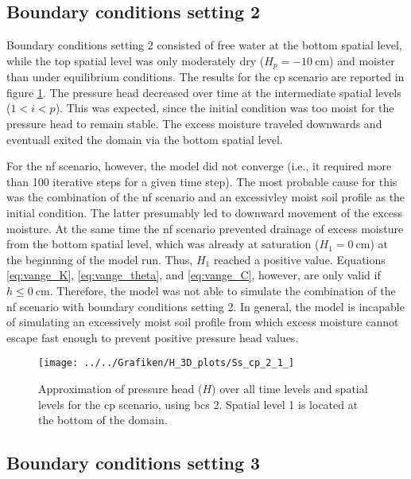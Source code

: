 \subsection{Boundary conditions setting 2}

Boundary conditions setting 2 consisted of free water at the bottom spatial level, while the top spatial level was only moderately dry ($H_p = \SI{-10}{\centi\meter}$) and moister than under equilibrium conditions.  The results for the cp scenario are reported in figure \ref{fig:cp2}.  The pressure head decreased over time at the intermediate spatial levels ($1 < i < p$).  This was expected, since the initial condition was too moist for the pressure head to remain stable.  The excess moisture traveled downwards and eventuall exited the domain via the bottom spatial level.

For the nf scenario, however, the model did not converge (i.e., it required more than \SI{100}{} iterative steps for a given time step).  The most probable cause for this was the combination of the nf scenario and an excessivley moist soil profile as the initial condition.  The latter presumably led to downward movement of the excess moisture.  At the same time the nf scenario prevented drainage of excess moisture from the bottom spatial level, which was already at saturation ($H_1 = \SI{0}{\centi\meter}$) at the beginning of the model run.  Thus, $H_1$ reached a positive value.  Equations \eqref{eq:vange_K}, \eqref{eq:vange_theta}, and \eqref{eq:vange_C}, however, are only valid if $h \leq \SI{0}{\centi\meter}$.  Therefore, the model was not able to simulate the combination of the nf scenario with boundary conditions setting 2.  In general, the model is incapable of simulating an excessively moist soil profile from which excess moisture cannot escape fast enough to prevent positive pressure head values.

\begin{figure}[H]
  \centering
  \texttt{[image: ../../Grafiken/H\_3D\_plots/Ss\_cp\_2\_1\_]}
  \caption{Approximation of pressure head ($H$) over all time levels and spatial levels for the cp scenario, using bcs 2.  Spatial level 1 is located at the bottom of the domain.}
  \label{fig:cp2}
\end{figure}

\subsection{Boundary conditions setting 3}

